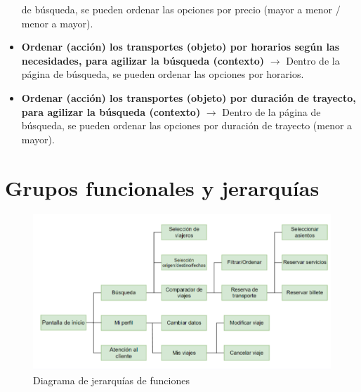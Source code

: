 \begin{itemize}
    de búsqueda, se pueden ordenar las opciones por precio (mayor a menor / menor a mayor).
    \item \textbf{Ordenar (acción) los transportes (objeto) por horarios según las necesidades, para agilizar la búsqueda (contexto)} $\rightarrow$ Dentro de la página 
    de búsqueda, se pueden ordenar las opciones por horarios.
    \item \textbf{Ordenar (acción) los transportes (objeto) por duración de trayecto, para agilizar la búsqueda (contexto)} $\rightarrow$ Dentro de la página de 
    búsqueda, se pueden ordenar las opciones por duración de trayecto (menor a mayor).
\end{itemize}

\section{Grupos funcionales y jerarquías}

\begin{figure}[H]
    \centering
    \includegraphics[width=0.8\linewidth]{./Imagenes/jerarquia.png}
    \caption{Diagrama de jerarquías de funciones}
    \label{fig:jerarquias}
\end{figure}

